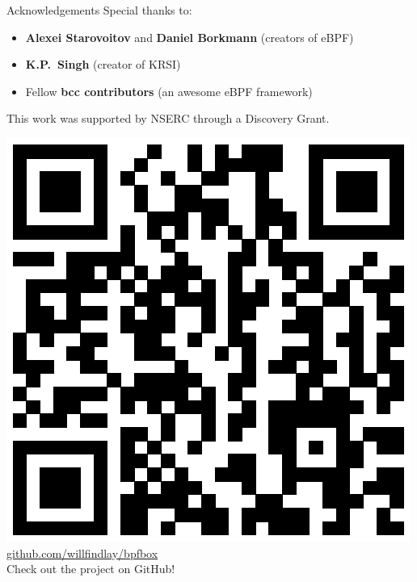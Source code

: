 \documentclass[12pt, dvipsnames, aspectratio=169]{beamer}
\begin{document}
\begin{frame}[c]{Acknowledgements}
Special thanks to:
\begin{itemize}
    \item \textbf{Alexei Starovoitov} and \textbf{Daniel Borkmann} (creators of eBPF)
    \item \textbf{K.P.~Singh} (creator of KRSI)
    \item Fellow \textbf{bcc contributors} (an awesome eBPF framework)
\end{itemize}
\vfill
This work was supported by NSERC through a Discovery Grant.
\begin{center}
    \includegraphics[height=0.4\textheight]{figs/bpfbox-qrcode.eps}\\
    \href{https://github.com/willfindlay/bpfbox}{\ttfamily github.com/willfindlay/bpfbox}\\
    Check out the project on GitHub!
\end{center}
\end{frame}
\end{document}
